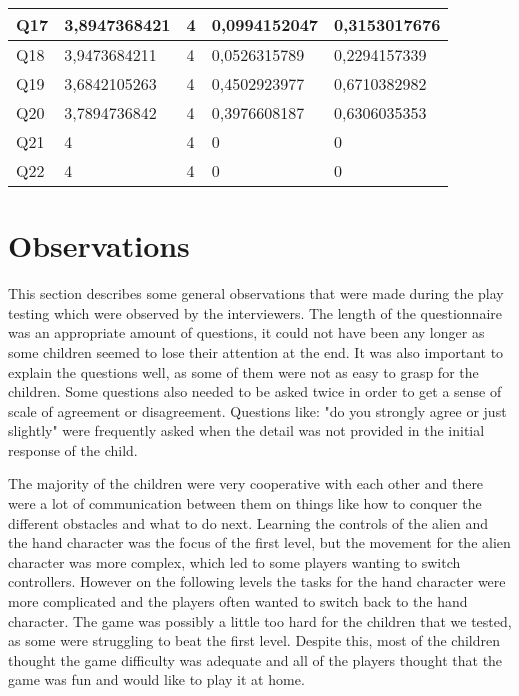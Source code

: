 \begin{table}[!ht]
\begin{tabular}{|l|l|l|l|l|}
		Q17               & 3,8947368421  & 4               & 0,0994152047      & 0,3153017676    \\ \hline
		Q18               & 3,9473684211  & 4               & 0,0526315789      & 0,2294157339    \\ \hline
		Q19               & 3,6842105263  & 4               & 0,4502923977      & 0,6710382982    \\ \hline
		Q20               & 3,7894736842  & 4               & 0,3976608187      & 0,6306035353    \\ \hline
		Q21               & 4             & 4               & 0                 & 0               \\ \hline
		Q22               & 4             & 4               & 0                 & 0               \\ \hline
	\end{tabular}
\end{table}


\section{Observations}
This section describes some general observations that were made during the play testing which were observed by the interviewers. The length of the questionnaire was an appropriate amount of questions, it could not have been any longer as some children seemed to lose their attention at the end. It was also important to explain the questions well, as some of them were not as easy to grasp for the children. Some questions also needed to be asked twice in order to get a sense of scale of agreement or disagreement. Questions like: "do you strongly agree or just slightly" were frequently asked when the detail was not provided in the initial response of the child. 

The majority of the children were very cooperative with each other and there were a lot of communication between them on things like how to conquer the different obstacles and what to do next. Learning the controls of the alien and the hand character was the focus of the first level, but the movement for the alien character was more complex, which led to some players wanting to switch controllers. However on the following levels the tasks for the hand character were more complicated and the players often wanted to switch back to the hand character. The game was possibly a little too hard for the children that we tested, as some were struggling to beat the first level.  Despite this, most of the children thought the game difficulty was adequate and all of the players thought that the game was fun and would like to play it at home.


